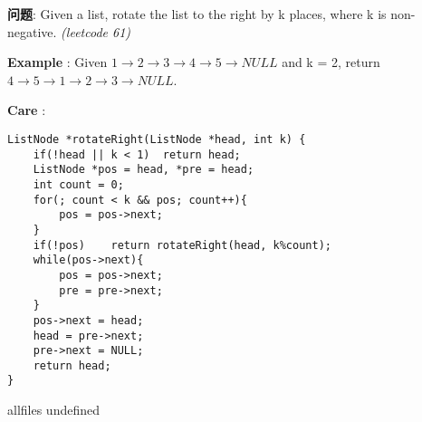 \documentclass{article}
\begin{document}
\begin{CJK}{UTF8}{gbsn}     %

\else
    
\begin{description}
    \item{\textbf{问题}}: Given a list, rotate the list to the right by k places, where k is non-negative. \textit{(leetcode 61)}
    \item{\textbf{Example}} : Given $1\rightarrow2\rightarrow3\rightarrow4\rightarrow5\rightarrow NULL$ and k = 2, return $4\rightarrow5\rightarrow1\rightarrow2\rightarrow3\rightarrow NULL$.
    \item{\textbf{Care}} : 
    \\
    \begin{lstlisting}
ListNode *rotateRight(ListNode *head, int k) {
	if(!head || k < 1)	return head;
	ListNode *pos = head, *pre = head;
	int count = 0;
	for(; count < k && pos; count++){
		pos = pos->next;
	}
	if(!pos)	return rotateRight(head, k%count);
	while(pos->next){
		pos = pos->next;
		pre = pre->next;
	}
	pos->next = head;
	head = pre->next;
	pre->next = NULL;
	return head;
}
    \end{lstlisting}
\end{description}

\fi

\ifx allfiles undefined
\end{CJK}
\end{document}
